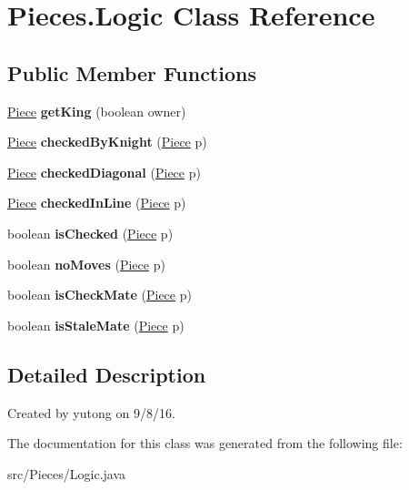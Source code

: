 \hypertarget{classMain_1_1Logic}{\section{Pieces.\-Logic Class Reference}
\label{classMain_1_1Logic}
}
\subsection*{Public Member Functions}
\begin{DoxyCompactItemize}
\item 
\hypertarget{classMain_1_1Logic_ab894a7a247db3294805866b8b85efc36}{\hyperlink{classMain_1_1Piece}{Piece} {\bfseries get\-King} (boolean owner)}\label{classMain_1_1Logic_ab894a7a247db3294805866b8b85efc36}

\item 
\hypertarget{classMain_1_1Logic_ac0e8e52849bed249cf7ad28f1d669510}{\hyperlink{classMain_1_1Piece}{Piece} {\bfseries checked\-By\-Knight} (\hyperlink{classMain_1_1Piece}{Piece} p)}\label{classMain_1_1Logic_ac0e8e52849bed249cf7ad28f1d669510}

\item 
\hypertarget{classMain_1_1Logic_a399e5071890dc66d0b3c647a0a221397}{\hyperlink{classMain_1_1Piece}{Piece} {\bfseries checked\-Diagonal} (\hyperlink{classMain_1_1Piece}{Piece} p)}\label{classMain_1_1Logic_a399e5071890dc66d0b3c647a0a221397}

\item 
\hypertarget{classMain_1_1Logic_a8f9d35eae778dda824c72ff38ae0a72b}{\hyperlink{classMain_1_1Piece}{Piece} {\bfseries checked\-In\-Line} (\hyperlink{classMain_1_1Piece}{Piece} p)}\label{classMain_1_1Logic_a8f9d35eae778dda824c72ff38ae0a72b}

\item 
\hypertarget{classMain_1_1Logic_a4b9b5ceffa3b3e0fcaaca52e92ea21af}{boolean {\bfseries is\-Checked} (\hyperlink{classMain_1_1Piece}{Piece} p)}\label{classMain_1_1Logic_a4b9b5ceffa3b3e0fcaaca52e92ea21af}

\item 
\hypertarget{classMain_1_1Logic_aa4926570967c96cfcbeb5943bd807f8d}{boolean {\bfseries no\-Moves} (\hyperlink{classMain_1_1Piece}{Piece} p)}\label{classMain_1_1Logic_aa4926570967c96cfcbeb5943bd807f8d}

\item 
\hypertarget{classMain_1_1Logic_a5d1dfc9c5dc5e29cc9a54faf8e9c2a39}{boolean {\bfseries is\-Check\-Mate} (\hyperlink{classMain_1_1Piece}{Piece} p)}\label{classMain_1_1Logic_a5d1dfc9c5dc5e29cc9a54faf8e9c2a39}

\item 
\hypertarget{classMain_1_1Logic_ab97bb6cc0ec1c9af97477b0330a50a45}{boolean {\bfseries is\-Stale\-Mate} (\hyperlink{classMain_1_1Piece}{Piece} p)}\label{classMain_1_1Logic_ab97bb6cc0ec1c9af97477b0330a50a45}

\end{DoxyCompactItemize}


\subsection{Detailed Description}
Created by yutong on 9/8/16. 

The documentation for this class was generated from the following file\-:\begin{DoxyCompactItemize}
\item 
src/\-Pieces/Logic.\-java\end{DoxyCompactItemize}
